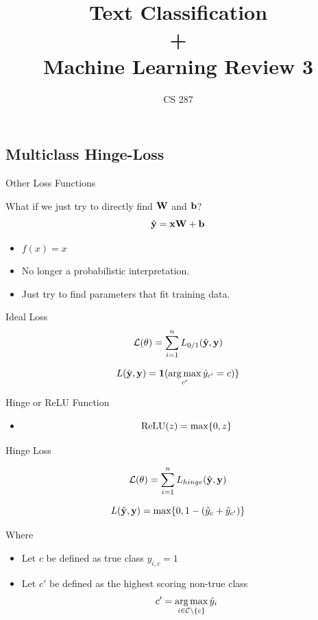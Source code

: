 \documentclass{beamer}
\title{Text Classification\\ + \\ Machine Learning Review 3 }
\date{}
\author{CS 287}
\begin{document}
\begin{frame}
  \titlepage
\end{frame}

\subsection{Multiclass Hinge-Loss}


\begin{frame}{Other Loss Functions}
  
  What if we just try to directly find $\mathbf{W}$ and $\mathbf{b}$? 
     \[\hat{\mathbf{y}} = \mathbf{x} \mathbf{W} + \mathbf{b}\]   
     
     \begin{itemize}
     \item $f(x) = x$ 
     \item No longer a probabilistic interpretation.
     \item Just try to find parameters that fit training data.
     \end{itemize}

\end{frame}

\begin{frame}{Ideal Loss}
  \[{\mathcal{L}(\theta)} = \sum_{i=1}^n L_{0/1}(\hat{\mathbf{y}}, \mathbf{y}) \] 

  \[ L(\hat{\boldy}, \boldy) =  \indicator(\argmax_{c'} \hat{y}_{c'} = c) \}  \]
\end{frame}


\begin{frame}{Hinge or ReLU Function}
  \begin{itemize}
  \item \[\relu(z) = \max\{0, z\}  \]
  \end{itemize}

\end{frame}

\begin{frame}{Hinge Loss}

  \[{\mathcal{L}(\theta)} = \sum_{i=1}^n L_{hinge}(\hat{\mathbf{y}}, \mathbf{y}) \] 


  \[ L(\hat{\mathbf{y}}, \mathbf{y}) =  \max\{0, 1 - (\hat{y}_{c} + \hat{y}_{c'}) \}  \]

  Where 
  \begin{itemize}
  \item   Let $c$ be defined as true class $y_{i, c} = 1$  
  \item   Let $c'$ be defined as the highest scoring non-true class 
    \[c' = \argmax_{i \in \mcC \setminus\{c\}} \hat{y}_i \] 
  \end{itemize}
\end{frame}
\end{document}
